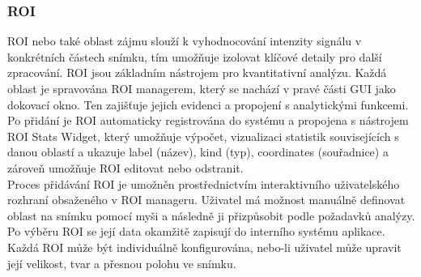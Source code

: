 \documentclass[a4paper,11pt]{article}
\begin{document}
\subsubsection{ROI}
ROI nebo také oblast zájmu slouží k vyhodnocování intenzity signálu v konkrétních částech snímku, tím umožňuje izolovat klíčové detaily pro další zpracování. ROI jsou základním nástrojem pro kvantitativní analýzu. Každá oblast je spravována ROI managerem, který se nachází v pravé části GUI jako dokovací okno. Ten zajišťuje jejich evidenci a propojení s analytickými funkcemi. Po přidání je ROI automaticky registrována do systému a propojena s nástrojem ROI Stats Widget, který umožňuje výpočet, vizualizaci statistik souvisejících s danou oblastí a ukazuje label (název), kind (typ), coordinates (souřadnice) a zároveň umožňuje ROI editovat nebo odstranit.\\

Proces přidávání ROI je umožněn prostřednictvím interaktivního uživatelského rozhraní obsaženého v ROI manageru. Uživatel má možnost manuálně definovat oblast na snímku pomocí myši a následně ji přizpůsobit podle požadavků analýzy. Po výběru ROI se její data okamžitě zapisují do interního systému aplikace. Každá ROI může být individuálně konfigurována, nebo-li uživatel může upravit její velikost, tvar a přesnou polohu ve snímku.\\
\end{document}
